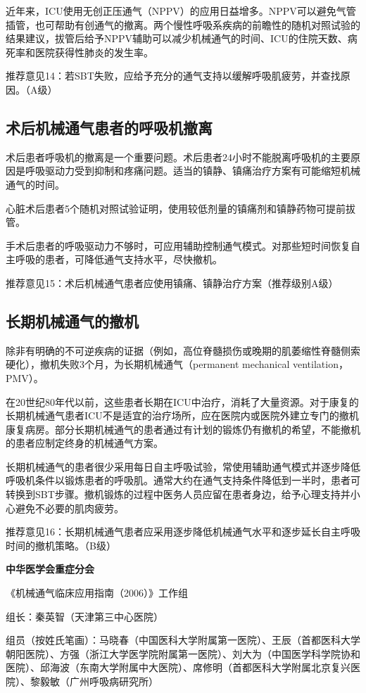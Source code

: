 近年来，ICU使用无创正压通气（NPPV）的应用日益增多。NPPV可以避免气管插管，也可帮助有创通气的撤离。两个慢性呼吸系疾病的前瞻性的随机对照试验的结果建议，拔管后给予NPPV辅助可以减少机械通气的时间、ICU的住院天数、病死率和医院获得性肺炎的发生率。

推荐意见14：若SBT失败，应给予充分的通气支持以缓解呼吸肌疲劳，并查找原因。（A级）

\subsection{术后机械通气患者的呼吸机撤离}

术后患者呼吸机的撤离是一个重要问题。术后患者24小时不能脱离呼吸机的主要原因是呼吸驱动力受到抑制和疼痛问题。适当的镇静、镇痛治疗方案有可能缩短机械通气的时间。

心脏术后患者5个随机对照试验证明，使用较低剂量的镇痛剂和镇静药物可提前拔管。

手术后患者的呼吸驱动力不够时，可应用辅助控制通气模式。对那些短时间恢复自主呼吸的患者，可降低通气支持水平，尽快撤机。

推荐意见15：术后机械通气患者应使用镇痛、镇静治疗方案（推荐级别A级）

\subsection{长期机械通气的撤机}

除非有明确的不可逆疾病的证据（例如，高位脊髓损伤或晚期的肌萎缩性脊髓侧索硬化），撤机失败3个月，为长期机械通气（permanent
mechanical ventilation，PMV）。

在20世纪80年代以前，这些患者长期在ICU中治疗，消耗了大量资源。对于康复的长期机械通气患者ICU不是适宜的治疗场所，应在医院内或医院外建立专门的撤机康复病房。部分长期机械通气的患者通过有计划的锻炼仍有撤机的希望，不能撤机的患者应制定终身的机械通气方案。

长期机械通气的患者很少采用每日自主呼吸试验，常使用辅助通气模式并逐步降低呼吸机条件以锻炼患者的呼吸肌。通常大约在通气支持条件降低到一半时，患者可转换到SBT步骤。撤机锻炼的过程中医务人员应留在患者身边，给予心理支持并小心避免不必要的肌肉疲劳。

推荐意见16：长期机械通气患者应采用逐步降低机械通气水平和逐步延长自主呼吸时间的撤机策略。（B级）

\textbf{中华医学会重症分会}

《机械通气临床应用指南（2006）》工作组

组长：秦英智（天津第三中心医院）

组员（按姓氏笔画）：马晓春（中国医科大学附属第一医院）、王辰（首都医科大学朝阳医院）、方强（浙江大学医学院附属第一医院）、刘大为（中国医学科学院协和医院）、邱海波（东南大学附属中大医院）、席修明（首都医科大学附属北京复兴医院）、黎毅敏（广州呼吸病研究所）

